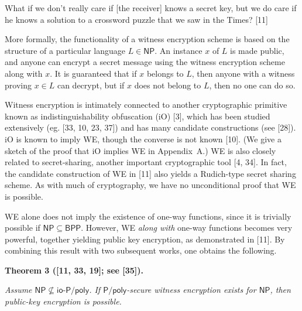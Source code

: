 What if we don’t really care if [the receiver] knows a secret key, but we do care if he knows a solution to a crossword puzzle that we saw in the Times? [11]\par



More formally, the functionality of a witness encryption scheme is based on the structure of a particular language $L\in{\mathsf{NP}}$. An instance $x$ of $L$ is made public, and anyone can encrypt a secret message using the witness encryption scheme along with $x$. It is guaranteed that if $x$ belongs to $L$, then anyone with a witness proving $x\in L$ can decrypt, but if $x$ does not belong to $L$, then no one can do so.\par




Witness encryption is intimately connected to another cryptographic primitive known as indistinguishability obfuscation (iO) [3], which has been studied extensively (eg. [33, 10, 23, 37]) and has many candidate constructions (see [28]). iO is known to imply WE, though the converse is not known [10]. (We give a sketch of the proof that iO implies WE in Appendix A.) WE is also closely related to secret-sharing, another important cryptographic tool [4, 34]. In fact, the candidate construction of WE in [11] also yields a Rudich-type secret sharing scheme. As with much of cryptography, we have no unconditional proof that WE is possible.\par




WE alone does not imply the existence of one-way functions, since it is trivially possible if ${\mathsf{NP}}\subseteq{\mathsf{BPP}}$. However, WE \emph{along with} one-way functions becomes very powerful, together yielding public key encryption, as demonstrated in [11]. By combining this result with two subsequent works, one obtains the following.\par





\par\medskip\noindent\textbf{
\textbf{Theorem 3}\textbf{ }([11, 33, 19]; see [35])\textbf{.}
}\par



\emph{Assume ${\mathsf{NP}}\nsubseteq{\mathsf{io\text{-}}}{\mathsf{P}}/{\mathsf{poly}}$. If ${\mathsf{P}}/{\mathsf{poly}}$-secure witness encryption exists for ${\mathsf{NP}}$, then public-key encryption is possible.}\par




